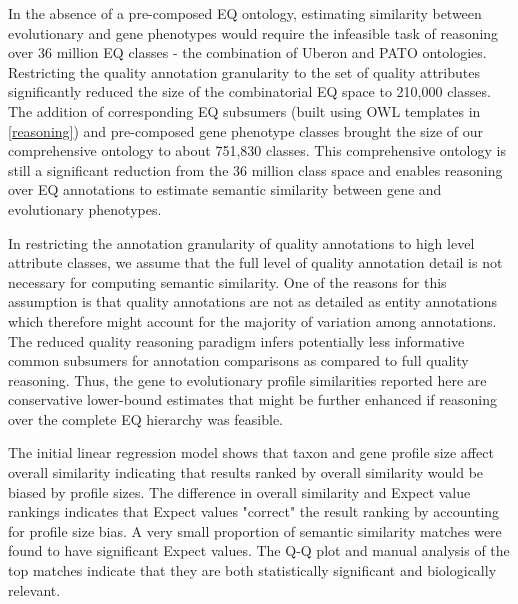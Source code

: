 \documentclass{article}
\begin{document}
In the absence of a pre-composed EQ ontology, estimating similarity between evolutionary and gene phenotypes would require the infeasible task of reasoning over 36 million EQ classes - the combination of Uberon and PATO ontologies. Restricting the quality annotation granularity to the set of quality attributes significantly reduced the size of the combinatorial EQ space to 210,000 classes. The addition of corresponding EQ subsumers (built using OWL templates in \ref{reasoning}) and pre-composed gene phenotype classes brought the size of our comprehensive ontology to about 751,830 classes. This comprehensive ontology is still a significant reduction from the 36 million class space and enables reasoning over EQ annotations to estimate semantic similarity between gene and evolutionary phenotypes. 


In restricting the annotation granularity of quality annotations to high level attribute classes, we assume that the full level of quality annotation detail is not necessary for computing semantic similarity. One of the reasons for this assumption is that quality annotations are not as detailed as entity annotations which therefore might account for the majority of variation among annotations. The reduced quality reasoning paradigm infers potentially less informative common subsumers for annotation comparisons as compared to full quality reasoning. Thus, the gene to evolutionary profile similarities reported here are conservative lower-bound estimates that might be further enhanced if reasoning over the complete EQ hierarchy was feasible.
 
 
The initial linear regression model shows that taxon and gene profile size affect overall similarity indicating that results ranked by overall similarity would be biased by profile sizes. The difference in overall similarity and Expect value rankings indicates that Expect values "correct" the result ranking by accounting for profile size bias. A very small proportion of semantic similarity matches were found to have significant Expect values. The Q-Q plot and manual analysis of the top matches indicate that they are both statistically significant and biologically relevant.
\end{document}

